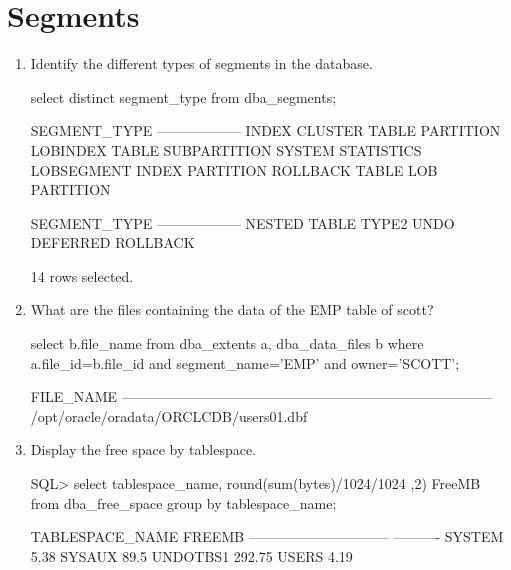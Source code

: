 \documentclass{article}
\begin{document}
\section{Segments }
\begin{enumerate}
\item{Identify the different types of segments in the database.}
\begin{sqlshell}
select distinct segment_type from dba_segments;
\end{sqlshell}
\begin{messageshell}
SEGMENT_TYPE
------------------
INDEX
CLUSTER
TABLE PARTITION
LOBINDEX
TABLE SUBPARTITION
SYSTEM STATISTICS
LOBSEGMENT
INDEX PARTITION
ROLLBACK
TABLE
LOB PARTITION

SEGMENT_TYPE
------------------
NESTED TABLE
TYPE2 UNDO
DEFERRED ROLLBACK

14 rows selected.
\end{messageshell}

\item{What are the files containing the data of the EMP table of scott?}

\begin{sqlshell}
select b.file_name from dba_extents a, dba_data_files b where a.file_id=b.file_id and segment_name='EMP' and owner='SCOTT';
\end{sqlshell}
\begin{messageshell}

FILE_NAME
--------------------------------------------------------------------------------
/opt/oracle/oradata/ORCLCDB/users01.dbf

\end{messageshell}
\item{Display the free space by tablespace. }
\begin{messageshell}
SQL> select tablespace_name, round(sum(bytes)/1024/1024 ,2) FreeMB
            from dba_free_space group by tablespace_name;
\end{messageshell}
\begin{messageshell}
TABLESPACE_NAME            FREEMB
------------------------------ ----------
SYSTEM                     5.38
SYSAUX                     89.5
UNDOTBS1               292.75
USERS                     4.19

\end{messageshell}
\end{enumerate}
\end{document}
